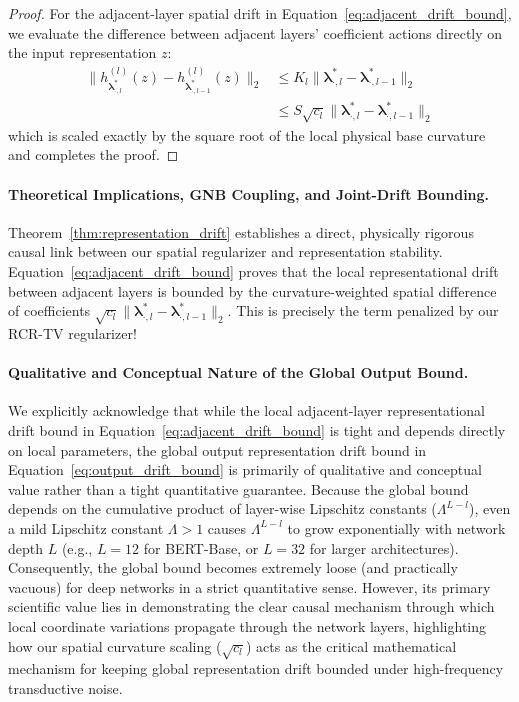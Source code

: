 \begin{proof}
For the adjacent-layer spatial drift in Equation~\ref{eq:adjacent_drift_bound}, we evaluate the difference between adjacent layers' coefficient actions directly on the input representation $z$:
\begin{align}
\|h^{(l)}_{\boldsymbol{\lambda}^*_{\cdot, l}}(z) - h^{(l)}_{\boldsymbol{\lambda}^*_{\cdot, l-1}}(z)\|_2 &\le K_l \|\boldsymbol{\lambda}^*_{\cdot, l} - \boldsymbol{\lambda}^*_{\cdot, l-1}\|_2 \nonumber \\
&\le S \sqrt{c_l} \|\boldsymbol{\lambda}^*_{\cdot, l} - \boldsymbol{\lambda}^*_{\cdot, l-1}\|_2
\end{align}
which is scaled exactly by the square root of the local physical base curvature and completes the proof.
\end{proof}

\paragraph{Theoretical Implications, GNB Coupling, and Joint-Drift Bounding.}
Theorem~\ref{thm:representation_drift} establishes a direct, physically rigorous causal link between our spatial regularizer and representation stability. Equation~\ref{eq:adjacent_drift_bound} proves that the local representational drift between adjacent layers is bounded by the curvature-weighted spatial difference of coefficients $\sqrt{c_l} \|\boldsymbol{\lambda}^*_{\cdot, l} - \boldsymbol{\lambda}^*_{\cdot, l-1}\|_2$. This is precisely the term penalized by our RCR-TV regularizer! 

\paragraph{Qualitative and Conceptual Nature of the Global Output Bound.}
We explicitly acknowledge that while the local adjacent-layer representational drift bound in Equation~\ref{eq:adjacent_drift_bound} is tight and depends directly on local parameters, the global output representation drift bound in Equation~\ref{eq:output_drift_bound} is primarily of qualitative and conceptual value rather than a tight quantitative guarantee. Because the global bound depends on the cumulative product of layer-wise Lipschitz constants ($\Lambda^{L-l}$), even a mild Lipschitz constant $\Lambda > 1$ causes $\Lambda^{L-l}$ to grow exponentially with network depth $L$ (e.g., $L=12$ for BERT-Base, or $L=32$ for larger architectures). Consequently, the global bound becomes extremely loose (and practically vacuous) for deep networks in a strict quantitative sense. However, its primary scientific value lies in demonstrating the clear causal mechanism through which local coordinate variations propagate through the network layers, highlighting how our spatial curvature scaling ($\sqrt{c_l}$) acts as the critical mathematical mechanism for keeping global representation drift bounded under high-frequency transductive noise.

